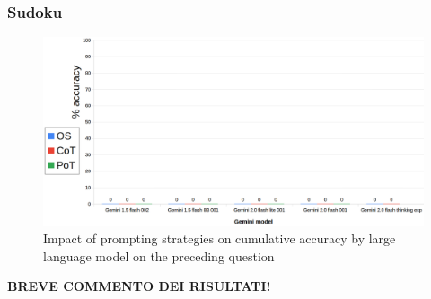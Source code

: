 \documentclass[12pt]{article}
\begin{document}
\subsubsection{Sudoku} %

\begin{figure}[H]
    \centering
            \includegraphics[width=1\textwidth]{q106Gemini.png}
    \caption[Accuracy on Question 6 by LLM]{Impact of prompting strategies on cumulative accuracy by large language model on the preceding question}
    \end{figure} 
\textbf{BREVE COMMENTO DEI RISULTATI!}
\end{document}
